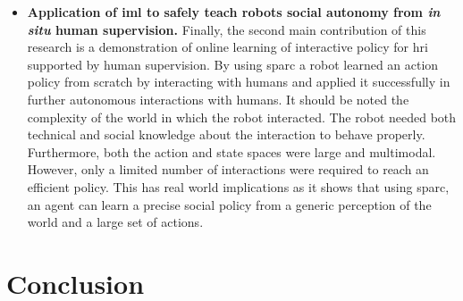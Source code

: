 \begin{itemize}
	\item \textbf{Application of \gls{iml} to safely teach robots social autonomy from \textit{in situ} human supervision.} Finally, the second main contribution of this research is a demonstration of online learning of interactive policy for \gls{hri} supported by human supervision. By using \gls{sparc} a robot learned an action policy from scratch by interacting with humans and applied it successfully in further autonomous interactions with humans. It should be noted the complexity of the world in which the robot interacted. The robot needed both technical and social knowledge about the interaction to behave properly. Furthermore, both the action and state spaces were large and multimodal. However, only a limited number of interactions were required to reach an efficient policy.	This has real world implications as it shows that using \gls{sparc}, an agent can learn a precise social policy from a generic perception of the world and a large set of actions. 
	
\end{itemize}

\section{Conclusion}\label{sec:conc_conc}

